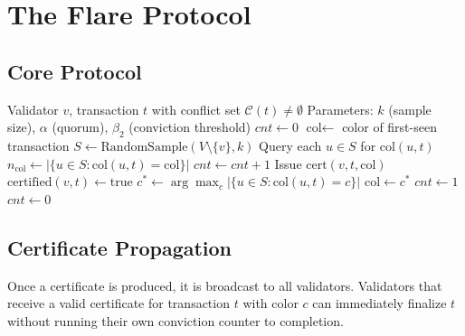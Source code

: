 \section{The Flare Protocol}

\label{sec:protocol}

\subsection{Core Protocol}

\begin{algorithm}[H]
\caption{Flare Protocol --- Conviction-Based Certification}
\label{alg:flare-core}
\begin{algorithmic}[1]
\Require Validator $v$, transaction $t$ with conflict set $\mathcal{C}(t) \neq \emptyset$
\Require Parameters: $k$ (sample size), $\alpha$ (quorum), $\beta_2$ (conviction threshold)
\State $cnt \gets 0$
\State $\text{col} \gets$ color of first-seen transaction
    \State $S \gets \text{RandomSample}(V \setminus \{v\}, k)$
    \State Query each $u \in S$ for $\text{col}(u, t)$
    \State $n_{\text{col}} \gets |\{u \in S : \text{col}(u, t) = \text{col}\}|$
        \State $cnt \gets cnt + 1$ 
            \State Issue $\text{cert}(v, t, \text{col})$
            \State $\text{certified}(v, t) \gets \text{true}$
        \EndIf
    \Else
        \State $c^* \gets \arg\max_c |\{u \in S : \text{col}(u, t) = c\}|$
            \State $\text{col} \gets c^*$ 
            \State $cnt \gets 1$ 
        \Else
            \State $cnt \gets 0$ 
        \EndIf
    \EndIf
\EndWhile
\end{algorithmic}
\end{algorithm}

\subsection{Certificate Propagation}

Once a certificate is produced, it is broadcast to all validators. Validators that
receive a valid certificate for transaction $t$ with color $c$ can immediately finalize
$t$ without running their own conviction counter to completion.

